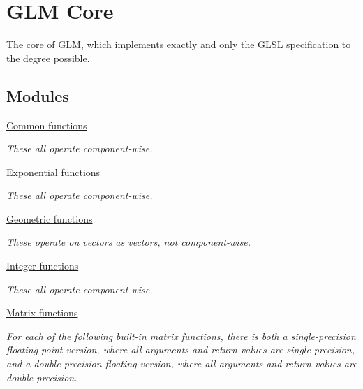 \hypertarget{group__core}{\section{G\-L\-M Core}
\label{group__core}
}


The core of G\-L\-M, which implements exactly and only the G\-L\-S\-L specification to the degree possible.  


\subsection*{Modules}
\begin{DoxyCompactItemize}
\item 
\hyperlink{group__core__func__common}{Common functions}
\begin{DoxyCompactList}\small\item\em These all operate component-\/wise. \end{DoxyCompactList}\item 
\hyperlink{group__core__func__exponential}{Exponential functions}
\begin{DoxyCompactList}\small\item\em These all operate component-\/wise. \end{DoxyCompactList}\item 
\hyperlink{group__core__func__geometric}{Geometric functions}
\begin{DoxyCompactList}\small\item\em These operate on vectors as vectors, not component-\/wise. \end{DoxyCompactList}\item 
\hyperlink{group__core__func__integer}{Integer functions}
\begin{DoxyCompactList}\small\item\em These all operate component-\/wise. \end{DoxyCompactList}\item 
\hyperlink{group__core__func__matrix}{Matrix functions}
\begin{DoxyCompactList}\small\item\em For each of the following built-\/in matrix functions, there is both a single-\/precision floating point version, where all arguments and return values are single precision, and a double-\/precision floating version, where all arguments and return values are double precision. \end{DoxyCompactList}\item 

\end{DoxyCompactItemize}

